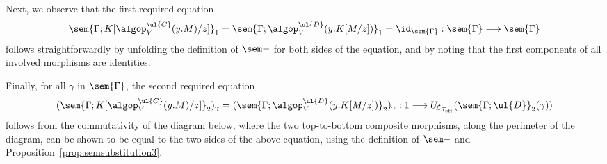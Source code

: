 Next, we observe that the first required equation
\[
\sem{\Gamma;{K[\algop^{\ul{C}}_V(y . M)/z]}}_1 = \sem{\Gamma;{\algop^{\ul{D}}_V(y . K[M/z])}}_1 = \id_{\sem{\Gamma}} : \sem{\Gamma} \longrightarrow \sem{\Gamma}
\]
follows straightforwardly by unfolding the definition of $\sem -$ for both sides of the equation, and by noting that the first components of all involved morphisms are identities.

Finally, for all $\gamma$ in $\sem{\Gamma}$, the second required equation
\[
(\sem{\Gamma;{K[\algop^{\ul{C}}_V(y . M)/z]}}_2)_\gamma = (\sem{\Gamma;{\algop^{\ul{D}}_V(y . K[M/z])}}_2)_\gamma : 1 \longrightarrow U_{\!\mathcal{L}_{\mathcal{T}_{\text{eff}}}}(\sem{\Gamma;\ul{D}}_2(\gamma))
\]
follows from the commutativity of the diagram below, where the two top-to-bottom composite morphisms, along the perimeter of the diagram, can be shown to be equal to the two sides of the above equation, using the definition of $\sem -$ and Proposition~\ref{prop:semsubstitution3}.


